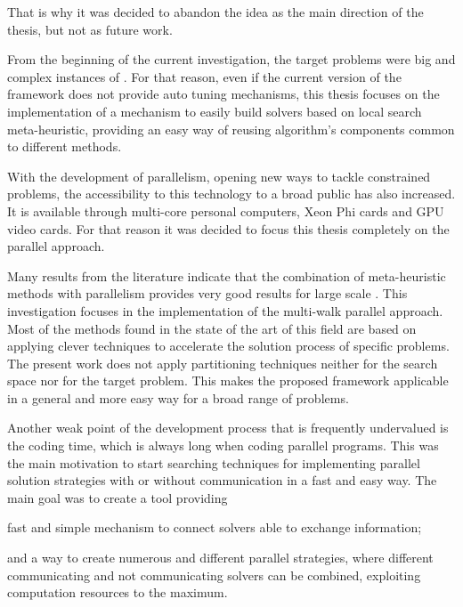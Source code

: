 That is why it was decided to abandon the idea as the main direction of the thesis, but not as future work.

From the beginning of the current investigation, the target problems were big and complex instances of \csps. For that reason, even if the current version of the framework does not provide auto tuning mechanisms, this thesis focuses on the implementation of a mechanism to easily build solvers based on local search meta-heuristic, providing an easy way of reusing algorithm's components common to different methods.

With the development of parallelism, opening new ways to tackle constrained problems, the accessibility to this technology to a broad public has also increased. It is available through multi-core personal computers, Xeon Phi cards and GPU video cards. For that reason it was decided to focus this thesis completely on the parallel approach. 

Many results from the literature indicate that the combination of meta-heuristic methods with parallelism provides very good results for large scale \csps. This investigation focuses in the implementation of the multi-walk parallel approach. Most of the methods found in the state of the art of this field are based on applying clever techniques to accelerate the solution process of specific problems. The present work does not apply partitioning techniques neither for the search space nor for the target problem. This makes the proposed framework applicable in a general and more easy way for a broad range of problems.

Another weak point of the development process that is frequently undervalued is the coding time, which is always long when coding parallel programs. This was the main motivation to start searching techniques for implementing parallel solution strategies with or without communication in a fast and easy way. The main goal was to create a tool providing 
\begin{inparaenum}[1-]
\item fast and simple mechanism to connect solvers able to exchange information; 
\item and a way to create numerous and different parallel strategies, where different communicating and not communicating solvers can be combined, exploiting computation resources to the maximum.
\end{inparaenum}

